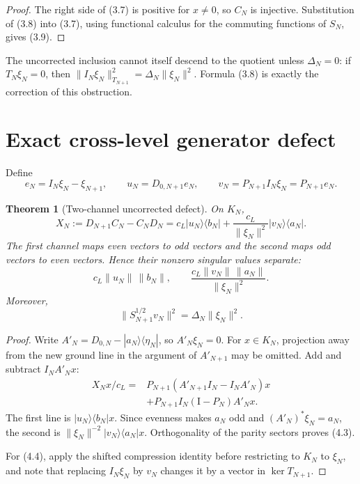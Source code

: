 \documentclass[11pt]{amsart}
\newtheorem{theorem}{Theorem}[section]
\theoremstyle{definition}
\theoremstyle{remark}
\newcommand{\id}{\mathrm I}
\begin{document}
\begin{proof}
The right side of (3.7) is positive for \(x\ne0\), so \(C_N\) is
injective.  Substitution of (3.8) into (3.7), using functional calculus for
the commuting functions of \(S_N\), gives (3.9).
\end{proof}

The uncorrected inclusion cannot itself descend to the quotient unless
\(\Delta_N=0\): if \(T_N\xi_N=0\), then
\(\|I_N\xi_N\|_{T_{N+1}}^2=\Delta_N\|\xi_N\|^2\).  Formula (3.8) is exactly
the correction of this obstruction.

\section{Exact cross-level generator defect}
\label{sec:defect}

Define
\[
 e_N=I_N\xi_N-\xi_{N+1},\qquad
 u_N=D_{0,N+1}e_N,\qquad
 v_N=P_{N+1}I_N\xi_N=P_{N+1}e_N.
\tag{4.1}
\]

\begin{theorem}[Two-channel uncorrected defect]
On \(K_N\),
\[
\boxed{
 X_N:=D_{N+1}C_N-C_ND_N
 =c_L|u_N\rangle\langle b_N|
  +\frac{c_L}{\|\xi_N\|^2}|v_N\rangle\langle a_N|.}
\tag{4.2}
\]
The first channel maps even vectors to odd vectors and the second maps odd
vectors to even vectors.  Hence their nonzero singular values separate:
\[
 c_L\|u_N\|\,\|b_N\|,
 \qquad
 \frac{c_L\|v_N\|\,\|a_N\|}{\|\xi_N\|^2}.
\tag{4.3}
\]
Moreover,
\[
\boxed{\|S_{N+1}^{1/2}v_N\|^2
       =\Delta_N\|\xi_N\|^2.}
\tag{4.4}
\]
\end{theorem}

\begin{proof}
Write \(A'_N=D_{0,N}-|a_N\rangle\langle\eta_N|\), so
\(A'_N\xi_N=0\).  For \(x\in K_N\), projection away from the new ground
line in the argument of \(A'_{N+1}\) may be omitted.  Add and subtract
\(I_NA'_Nx\):
\[
\begin{aligned}
X_Nx/c_L
={}&P_{N+1}(A'_{N+1}I_N-I_NA'_N)x\\
 &+P_{N+1}I_N(\id-P_N)A'_Nx.
\end{aligned}
\]
The first line is \(|u_N\rangle\langle b_N|x\).  Since evenness makes
\(a_N\) odd and \((A'_N)^*\xi_N=a_N\), the second is
\(\|\xi_N\|^{-2}|v_N\rangle\langle a_N|x\).  Orthogonality of the parity
sectors proves (4.3).

For (4.4), apply the shifted compression identity before restricting to
\(K_N\) to \(\xi_N\), and note that replacing \(I_N\xi_N\) by \(v_N\)
changes it by a vector in \(\ker T_{N+1}\).
\end{proof}
\end{document}
